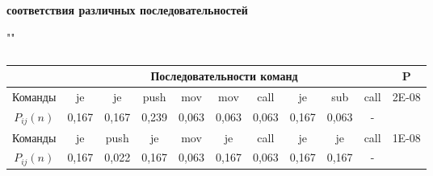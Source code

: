 \documentclass{book}
\begin{document}

\begin{table}[h!]

	\caption {\label{tabl:table4}}
	
	\centering
	\textbf{ соответствия различных последовательностей}

	\par{""}

	\begin{tabular}{|c|ccccccccc|c|}
		\hline
		& \multicolumn{9}{c|}{Последовательности команд}                                                                                                                                                                                               & P                      \\ \hline
		Команды & \multicolumn{1}{c|}{je}    & \multicolumn{1}{c|}{je}    & \multicolumn{1}{c|}{push}  & \multicolumn{1}{c|}{mov}   & \multicolumn{1}{c|}{mov}   & \multicolumn{1}{c|}{call}  & \multicolumn{1}{c|}{je}    & \multicolumn{1}{c|}{sub}   & call & \multirow{2}{*}{2E-08} \\ \cline{1-10}
		$P_{ij}(n)$  & \multicolumn{1}{c|}{0,167} & \multicolumn{1}{c|}{0,167} & \multicolumn{1}{c|}{0,239} & \multicolumn{1}{c|}{0,063} & \multicolumn{1}{c|}{0,063} & \multicolumn{1}{c|}{0,063} & \multicolumn{1}{c|}{0,167} & \multicolumn{1}{c|}{0,063} & -    &                        \\ \hline
		Команды & \multicolumn{1}{c|}{je}    & \multicolumn{1}{c|}{push}  & \multicolumn{1}{c|}{je}    & \multicolumn{1}{c|}{mov}   & \multicolumn{1}{c|}{je}    & \multicolumn{1}{c|}{call}  & \multicolumn{1}{c|}{je}    & \multicolumn{1}{c|}{je}    & call & \multirow{2}{*}{1E-08} \\ \cline{1-10}
		$P_{ij}(n)$  & \multicolumn{1}{c|}{0,167} & \multicolumn{1}{c|}{0,022} & \multicolumn{1}{c|}{0,167} & \multicolumn{1}{c|}{0,063} & \multicolumn{1}{c|}{0,167} & \multicolumn{1}{c|}{0,063} & \multicolumn{1}{c|}{0,167} & \multicolumn{1}{c|}{0,167} & -    &                        \\ \hline
	\end{tabular}
\end{table}
\end{document}
